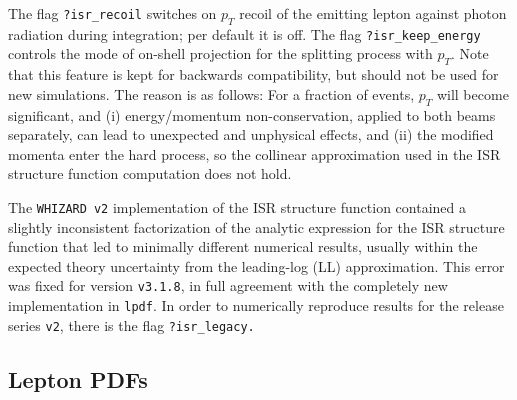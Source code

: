 \documentclass[12pt]{book}
\newcommand{\ttt}[1]{\texttt{#1}}
\newcommand{\whizard}{\ttt{WHIZARD}}
\begin{document}
{\footnotesize The flag \ttt{?isr\_recoil} switches on $p_T$ recoil of
  the emitting lepton against photon radiation during integration; per
  default it is off.  The flag \ttt{?isr\_keep\_energy} controls the
  mode of on-shell projection for the splitting process with $p_T$.
  Note that this feature is kept for backwards compatibility, but
  should not be used for new simulations.  The reason is as follows:
  For a fraction of events, $p_T$ will become significant, and (i)
  energy/momentum non-conservation, applied to both beams separately,
  can lead to unexpected and unphysical effects, and (ii) the modified
  momenta enter the hard process, so the collinear approximation used
  in the ISR structure function computation does not hold.

  The \whizard\ \texttt{v2} implementation of the ISR structure
  function contained a slightly inconsistent factorization of the
  analytic expression for the ISR structure function that led to
  minimally different numerical results, usually within the expected
  theory uncertainty from the leading-log (LL) approximation. This
  error was fixed for version \texttt{v3.1.8}, in full agreement with
  the completely new implementation in \texttt{lpdf}. In order to
  numerically reproduce results for the release series \texttt{v2},
  there is the flag \ttt{?isr\_legacy.}}


\subsection{Lepton PDFs}
\label{sec:lepton_pdf}
\end{document}
